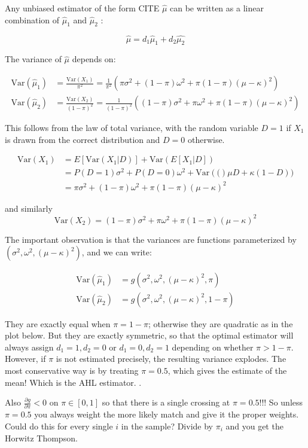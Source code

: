 \documentclass[11pt]{amsart}
\newcommand{\Var}[1]{\text{Var}\left(#1\right)}
\begin{document}
Any unbiased estimator of the form CITE $\hat{\mu}$ can be written as a linear combination of $\hat{\mu}_1$ and $\hat{\mu}_2$ :

$$\hat{\mu} = d_1 \hat{\mu}_1 + d_2 \hat{\mu_2}$$

The variance of $\hat{\mu}$ depends on:

\begin{align*} \Var{\hat{\mu}_1} &=  \frac{\text{Var}(X_1)}{\pi^2} = \frac{1}{\pi^2}\left(\pi \sigma^2 + (1-\pi) \omega^2 + \pi(1-\pi)(\mu-\kappa)^2\right) \\
\Var{\hat{\mu}_2} &= \frac{\Var{X_2}}{(1-\pi)^2} = \frac{1}{(1-\pi)^2}\left((1-\pi)\sigma^2 + \pi \omega^2 + \pi(1-\pi)(\mu-\kappa)^2\right) 
\end{align*}

This follows from the law of total variance, with the random variable $D = 1$ if $X_1$ is drawn from the correct distribution and $D=0$ otherwise. 

\begin{align*} \Var{X_1} &= E[\Var{X_1 | D}] + \Var{E[X_1| D]} \\ 
&= P(D=1)\sigma^2 +  P(D=0)\omega^2 + \Var(\mu D + \kappa (1-D)) \\
&= \pi \sigma^2 + (1-\pi) \omega^2 + \pi(1-\pi)(\mu-\kappa)^2
\end{align*}

and similarly 
$$\Var{X_2} = (1-\pi)\sigma^2 + \pi \omega^2 + \pi(1-\pi)(\mu-\kappa)^2 $$ 

The important observation is that the variances are functions parameterized by $(\sigma^2, \omega^2, (\mu-\kappa)^2)$, and we can write: 

\begin{align*} \Var{\hat{\mu}_1} &= g(\sigma^2, \omega^2, (\mu-\kappa)^2, \pi) \\
\Var{\hat{\mu}_2} &= g(\sigma^2, \omega^2, (\mu-\kappa)^2, 1-\pi)
\end{align*}

They are exactly equal when $\pi = 1-\pi$; otherwise they are quadratic as in the plot below.   But they are exactly symmetric, so that the optimal estimator will always assign $d_1 = 1, d_2= 0$ or $d_1=0, d_2=1$ depending on whether $\pi > 1-\pi$.  However, if $\pi$ is not estimated precisely, the resulting variance explodes.  The most conservative way is by treating $\pi = 0.5$, which gives the estimate of the mean!  Which is the AHL estimator. .

Also $\frac{\partial g}{\partial \pi} < 0$ on $\pi \in [0,1]$ so that there is a single crossing at $\pi=0.5$!!! So unless $\pi = 0.5$ you always weight the more likely match and give it the proper weights.  Could do this for every single $i$ in the sample?  Divide by $\pi_i$ and you get the Horwitz Thompson.    
\end{document}
